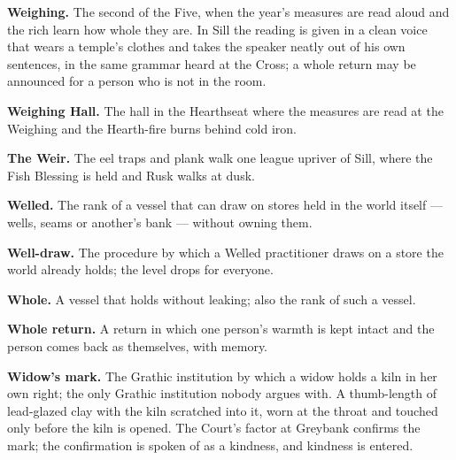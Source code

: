 \documentclass{design/chronicle}
\begin{document}
\textbf{Weighing.} The second of the Five, when the year’s measures are read aloud and the rich learn how whole they are. In Sill the reading is given in a clean voice that wears a temple’s clothes and takes the speaker neatly out of his own sentences, in the same grammar heard at the Cross; a whole return may be announced for a person who is not in the room.

\textbf{Weighing Hall.} The hall in the Hearthseat where the measures are read at the Weighing and the Hearth-fire burns behind cold iron.

\textbf{The Weir.} The eel traps and plank walk one league upriver of Sill, where the Fish Blessing is held and Rusk walks at dusk.

\textbf{Welled.} The rank of a vessel that can draw on stores held in the world itself — wells, seams or another’s bank — without owning them.

\textbf{Well-draw.} The procedure by which a Welled practitioner draws on a store the world already holds; the level drops for everyone.

\textbf{Whole.} A vessel that holds without leaking; also the rank of such a vessel.

\textbf{Whole return.} A return in which one person’s warmth is kept intact and the person comes back as themselves, with memory.

\textbf{Widow’s mark.} The Grathic institution by which a widow holds a kiln in her own right; the only Grathic institution nobody argues with. A thumb-length of lead-glazed clay with the kiln scratched into it, worn at the throat and touched only before the kiln is opened. The Court’s factor at Greybank confirms the mark; the confirmation is spoken of as a kindness, and kindness is entered.

\printindex[persons]
\printindex[places]
\printindex[lore]
\end{document}
